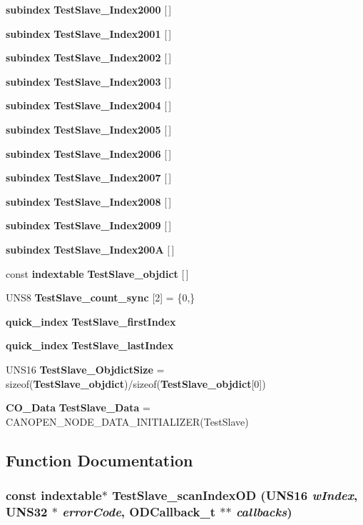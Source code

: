 \begin{CompactItemize}
\item 
{\bf subindex} {\bf Test\-Slave\_\-Index2000} [$\,$]
\item 
{\bf subindex} {\bf Test\-Slave\_\-Index2001} [$\,$]
\item 
{\bf subindex} {\bf Test\-Slave\_\-Index2002} [$\,$]
\item 
{\bf subindex} {\bf Test\-Slave\_\-Index2003} [$\,$]
\item 
{\bf subindex} {\bf Test\-Slave\_\-Index2004} [$\,$]
\item 
{\bf subindex} {\bf Test\-Slave\_\-Index2005} [$\,$]
\item 
{\bf subindex} {\bf Test\-Slave\_\-Index2006} [$\,$]
\item 
{\bf subindex} {\bf Test\-Slave\_\-Index2007} [$\,$]
\item 
{\bf subindex} {\bf Test\-Slave\_\-Index2008} [$\,$]
\item 
{\bf subindex} {\bf Test\-Slave\_\-Index2009} [$\,$]
\item 
{\bf subindex} {\bf Test\-Slave\_\-Index200A} [$\,$]
\item 
const {\bf indextable} {\bf Test\-Slave\_\-objdict} [$\,$]
\item 
UNS8 {\bf Test\-Slave\_\-count\_\-sync} [2] = \{0,\}
\item 
{\bf quick\_\-index} {\bf Test\-Slave\_\-first\-Index}
\item 
{\bf quick\_\-index} {\bf Test\-Slave\_\-last\-Index}
\item 
UNS16 {\bf Test\-Slave\_\-Objdict\-Size} = sizeof({\bf Test\-Slave\_\-objdict})/sizeof({\bf Test\-Slave\_\-objdict}[0])
\item 
{\bf CO\_\-Data} {\bf Test\-Slave\_\-Data} = CANOPEN\_\-NODE\_\-DATA\_\-INITIALIZER(Test\-Slave)
\end{CompactItemize}


\subsection{Function Documentation}
\subsubsection{\setlength{\rightskip}{0pt plus 5cm}const {\bf indextable}$\ast$ Test\-Slave\_\-scan\-Index\-OD (UNS16 {\em w\-Index}, UNS32 $\ast$ {\em error\-Code}, {\bf ODCallback\_\-t} $\ast$$\ast$ {\em callbacks})}\label{TestSlave_8c_f47ba769e96d7ffc765e37aa81b452ad}


